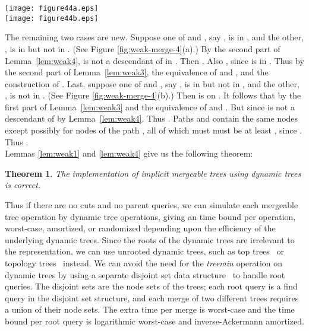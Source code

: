 \documentclass[twoside,leqno,twocolumn]{article}
\newtheorem{theorem}{Theorem}
\newcommand{\proofend}{\\}
\begin{document}
\begin{figure*}\begin{center}
\resizebox{.65\textwidth}{!} {\texttt{[image: figure44a.eps]}}\\
\vspace{.5cm}
\resizebox{.65\textwidth}{!} {\texttt{[image: figure44b.eps]}}
\end{center}
\caption{\label{fig:weak-merge-4} Proof of Lemma~\ref{lem:weak5}. Node ,  is the child of  in  that is an ancestor of , and  is the parent of  in . After the merge,  and  are on .
(a) Node  is in  and  is in  but not in . Then  is not a descendant of  in , so . Since , . These two facts imply . (b) Node  is in  but not in  and  is not in . Then . All nodes in  are greater than or equal to ; thus .}
\end{figure*}

The remaining two cases are new.  Suppose one of  and , say , is in , and the other, , is in  but not in .
(See Figure \ref{fig:weak-merge-4}(a).) By the second part of Lemma~\ref{lem:weak4},  is not a descendant of  in .  Then . Also , since  is in .  Thus  by the second part of
Lemma~\ref{lem:weak3}, the equivalence of  and , and the construction of .  Last, suppose one of  and , say ,
is in  but not in , and the other, , is not in . (See Figure \ref{fig:weak-merge-4}(b).) Then  is on .
It follows that  by the first part of Lemma~\ref{lem:weak3} and the equivalence of  and .  But  since  is not a descendant of  by Lemma~\ref{lem:weak4}.  Thus .  Paths  and  contain the same nodes except possibly for nodes of the path , all of which must must be at least , since . Thus .
\proofend

Lemmas \ref{lem:weak1} and \ref{lem:weak4} give us the following theorem:
\begin{theorem}
\label{theorem:implicit} The implementation of implicit mergeable trees using dynamic trees is correct.
\end{theorem}
Thus if there are no cuts and no parent queries, we can simulate each mergeable tree operation by  dynamic tree operations, giving an  time bound per operation, worst-case, amortized, or randomized depending upon the efficiency of the underlying dynamic trees.  Since the roots of the dynamic trees are irrelevant to the representation, we can use unrooted dynamic trees, such as top trees~\cite{AHTdL05} or topology trees~\cite{Fre97a} instead.  We can avoid the need for the \emph{treemin} operation on dynamic trees by using a separate disjoint set data structure~\cite{Tar75,Smi90} to handle root queries.  The disjoint sets are the node sets of the trees; each root query is a find query in the disjoint set structure, and each merge of two different trees requires a union of their node sets.  The extra time per merge is  worst-case and the time bound per root query is logarithmic worst-case and inverse-Ackermann amortized.
\end{document}
